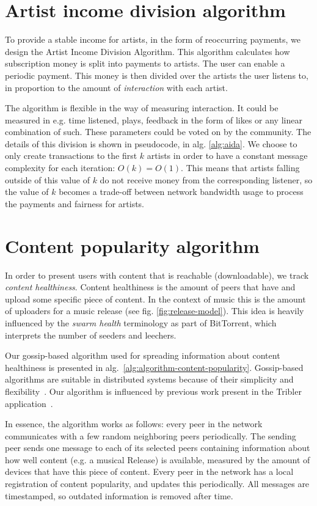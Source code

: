 \section{Artist income division algorithm}
\label{sec:aida-design}
To provide a stable income for artists, in the form of reoccurring payments, we design the Artist Income Division Algorithm. This algorithm calculates how subscription money is split into payments to artists. The user can enable a periodic payment. This money is then divided over the artists the user listens to, in proportion to the amount of \textit{interaction} with each artist. 

The algorithm is flexible in the way of measuring interaction. It could be measured in e.g. time listened, plays, feedback in the form of likes or any linear combination of such. These parameters could be voted on by the community. The details of this division is shown in pseudocode, in alg. \ref{alg:aida}. We choose to only create transactions to the first $k$ artists in order to have a constant message complexity for each iteration: $O(k) = O(1)$. This means that artists falling outside of this value of $k$ do not receive money from the corresponding listener, so the value of $k$ becomes a trade-off between network bandwidth usage to process the payments and fairness for artists.



\section{Content popularity algorithm}
In order to present users with content that is reachable (downloadable), we track \textit{content healthiness}. Content healthiness is the amount of peers that have and upload some specific piece of content. In the context of music this is the amount of uploaders for a music release (see fig. \ref{fig:release-model}). This idea is heavily influenced by the \textit{swarm health} terminology as part of BitTorrent, which interprets the number of seeders and leechers.


Our gossip-based algorithm used for spreading information about content healthiness is presented in alg.~\ref{alg:algorithm-content-popularity}. Gossip-based algorithms are suitable in distributed systems because of their simplicity and flexibility~\citep{kermarrec2007gossiping}. Our algorithm is influenced by previous work present in the Tribler application~\citep{pouwelse2008tribler}. 

In essence, the algorithm works as follows: every peer in the network communicates with a few random neighboring peers periodically. The sending peer sends one message to each of its selected peers containing information about how well content (e.g. a musical Release) is available, measured by the amount of devices that have this piece of content. Every peer in the network has a local registration of content popularity, and updates this periodically. All messages are timestamped, so outdated information is removed after time.

